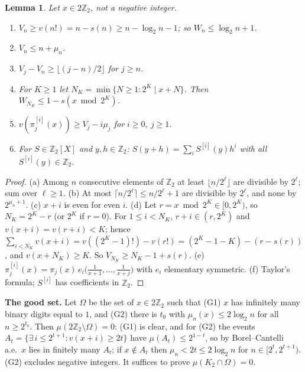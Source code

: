 \documentclass[11pt]{amsart}
\newtheorem{lemma}[theorem]{Lemma}
\theoremstyle{definition}
\newcommand{\Z}{\mathbb Z}
\begin{document}
\begin{lemma}\label{lem:val}
Let $x\in2\Z_2$, not a negative integer.
\begin{enumerate}
\item[(a)] $V_n\ge v(n!)=n-s(n)\ge n-\log_2n-1$; so $W_n\le\log_2 n+1$.
\item[(b)] $V_n\le n+\mu_n$.
\item[(c)] $V_j-V_n\ge\lfloor (j-n)/2\rfloor$ for $j\ge n$.
\item[(d)] For $K\ge1$ let $N_K=\min\{N\ge1: 2^K\mid x+N\}$. Then $W_{N_K}\le 1-s(x\bmod 2^K)$.
\item[(e)] $v(\pi_j^{[i]}(x))\ge V_j-i\mu_j$ for $i\ge0$, $j\ge1$.
\item[(f)] For $S\in\Z_2[X]$ and $y,h\in\Z_2$: $S(y+h)=\sum_{i}S^{[i]}(y)h^i$ with all $S^{[i]}(y)\in\Z_2$.
\end{enumerate}
\end{lemma}
\begin{proof}
(a) Among $n$ consecutive elements of $\Z_2$ at least $\lfloor n/2^\ell\rfloor$ are divisible by $2^\ell$; sum over $\ell\ge1$.
(b) At most $\lceil n/2^\ell\rceil\le n/2^\ell+1$ are divisible by $2^\ell$, and none by $2^{\mu_n+1}$.
(c) $x+i$ is even for even $i$.
(d) Let $r=x\bmod2^K\in[0,2^K)$, so $N_K=2^K-r$ (or $2^K$ if $r=0$). For $1\le i<N_K$, $r+i\in(r,2^K)$ and
$v(x+i)=v(r+i)<K$; hence $\sum_{i<N_K}v(x+i)=v((2^K-1)!)-v(r!)=(2^K-1-K)-(r-s(r))$, and $v(x+N_K)\ge K$.
So $V_{N_K}\ge N_K-1+s(r)$.
(e) $\pi_j^{[i]}(x)=\pi_j(x)\,e_i\big(\tfrac1{x+1},\dots,\tfrac1{x+j}\big)$ with $e_i$ elementary symmetric.
(f) Taylor's formula; $S^{[i]}$ has coefficients in $\Z_2$.
\end{proof}

\noindent\textbf{The good set.} Let $\Omega$ be the set of $x\in2\Z_2$ such that (G1) $x$ has infinitely many binary digits
equal to $1$, and (G2) there is $t_0$ with $\mu_n(x)\le2\log_2 n$ for all $n\ge 2^{t_0}$. Then $\mu(2\Z_2\setminus\Omega)=0$:
(G1) is clear, and for (G2) the events $A_t=\{\exists\, i\le2^{t+1}: v(x+i)\ge2t\}$ have $\mu(A_t)\le2^{1-t}$, so by
Borel--Cantelli a.e.\ $x$ lies in finitely many $A_t$; if $x\notin A_t$ then $\mu_n<2t\le2\log_2n$ for $n\in[2^t,2^{t+1})$.
(G2) excludes negative integers. It suffices to prove $\mu(K_2\cap\Omega)=0$.
\end{document}

